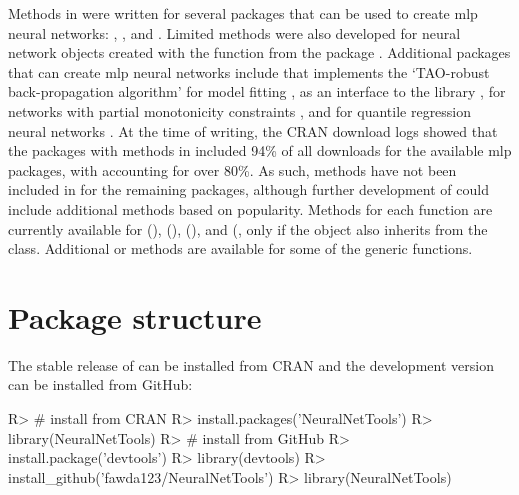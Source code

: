 \documentclass[article,shortnames]{jss}
\begin{document}
Methods in  were written for several  packages that can be used to create \ac{mlp} neural networks:  \citep{Fritsch12},  \citep{Venables02}, and  \citep{Bergmeir12}. Limited methods were also developed for neural network objects created with the  function from the  package \citep{Kuhn15}.  Additional  packages that can create \ac{mlp} neural networks include  that implements the `TAO-robust back-propagation algorithm' for model fitting \citep{Castejon14},  as an  interface to the   library \citep{Klima15},  for networks with partial monotonicity constraints \citep{Cannon15}, and  for quantile regression neural networks \citep{Cannon11}.  At the time of writing, the \ac{CRAN} download logs \citep{Csardi15} showed that the  packages with methods in  included 94\% of all downloads for the available \ac{mlp} packages, with  accounting for over 80\%.  As such, methods have not been included in  for the remaining packages, although further development of  could include additional methods based on popularity.  Methods for each function are currently available for   (),  (),  (), and  (, only if the object also inherits from the  class.  Additional  or  methods are available for some of the generic functions.

\section[Package structure]{Package structure}

The stable release of  can be installed from \ac{CRAN} and the development version can be installed from GitHub:

\begin{Schunk}
\begin{Sinput}
R> # install from CRAN
R> install.packages('NeuralNetTools')
R> library(NeuralNetTools)
R> # install from GitHub
R> install.package('devtools')
R> library(devtools)
R> install_github('fawda123/NeuralNetTools')
R> library(NeuralNetTools)
\end{Sinput}
\end{Schunk}
\end{document}
